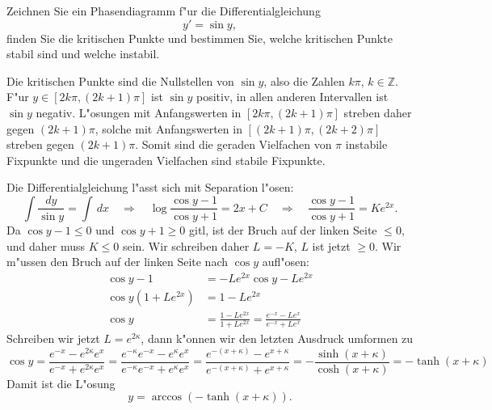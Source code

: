 Zeichnen Sie ein Phasendiagramm f"ur die Differentialgleichung
\[
y'=\sin y,
\]
finden Sie die kritischen Punkte und bestimmen Sie, welche kritischen
Punkte stabil sind und welche instabil.

\begin{loesung}
Die kritischen Punkte sind die Nullstellen von $\sin y$, also die
Zahlen $k\pi$, $k\in\mathbb Z$.
F"ur $y\in[2k\pi,(2k+1)\pi]$ ist $\sin y$ positiv, in allen
anderen Intervallen ist $\sin y$ negativ.
L"osungen mit Anfangswerten in $[2k\pi,(2k+1)\pi]$ streben daher
gegen $(2k+1)\pi$, solche mit Anfangswerten in $[(2k+1)\pi, (2k+2)\pi]$
streben gegen $(2k+1)\pi$.
Somit sind die geraden Vielfachen von $\pi$ instabile Fixpunkte
und die ungeraden Vielfachen sind stabile Fixpunkte.
\end{loesung}

\begin{diskussion}
Die Differentialgleichung l"asst sich mit Separation l"osen:
\[
\int \frac{dy}{\sin y}
=
\int\,dx
\quad\Rightarrow\quad
\log\frac{\cos y-1}{\cos y+1}
=
2x+C
\quad\Rightarrow\quad
\frac{\cos y-1}{\cos y+1}
=
Ke^{2x}.
\]
Da $\cos y-1\le 0$ und $\cos y +1\ge 0$ gitl, ist der Bruch auf der linken
Seite $\le 0$, und daher muss $K\le 0$ sein.
Wir schreiben daher $L=-K$, $L$ ist jetzt $\ge 0$.
Wir m"ussen den Bruch auf der linken Seite nach $\cos y$ aufl"osen:
\begin{align*}
\cos y - 1 &=-Le^{2x}\cos y -Le^{2x}
\\
\cos y(1+Le^{2x})
&=
1-Le^{2x}
\\
\cos y
&=
\frac{1-Le^{2x}}{1+Le^{2x}}
=
\frac{e^{-x}-Le^{x}}{e^{-x}+Le^x}
\end{align*}
Schreiben wir jetzt $L=e^{2\kappa}$, dann k"onnen wir den letzten
Ausdruck umformen zu
\[
\cos y
=
\frac{e^{-x}-e^{2\kappa}e^x}{e^{-x}+e^{2\kappa}e^x}
=
\frac{e^{-\kappa}e^{-x}-e^{\kappa}e^x}{e^{-\kappa}e^{-x}+e^{\kappa}e^x}
=
\frac{e^{-(x+\kappa)}-e^{x+\kappa}}{e^{-(x+\kappa)}+e^{x + \kappa}}
=
-\frac{\sinh(x+\kappa)}{\cosh(x+\kappa)}
=
-\tanh(x+\kappa)
\]
Damit ist die L"osung
\[
y=\arccos(-\tanh(x+\kappa)).
\]
\end{diskussion}

